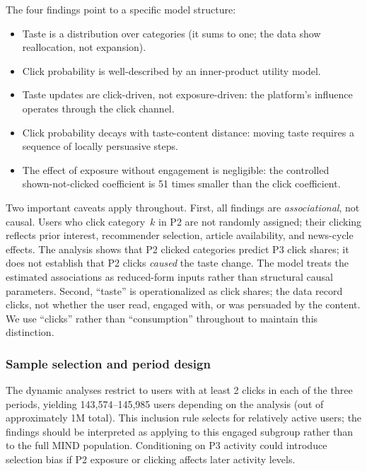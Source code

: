 \documentclass[11pt]{article}
\begin{document}
The four findings point to a specific model structure:
\begin{itemize}[leftmargin=1.5em, itemsep=0.2em]
\item Taste is a distribution over categories (it sums to one; the data show reallocation, not expansion).
\item Click probability is well-described by an inner-product utility model.
\item Taste updates are click-driven, not exposure-driven: the platform's influence operates through the click channel.
\item Click probability decays with taste-content distance: moving taste requires a sequence of locally persuasive steps.
\item The effect of exposure without engagement is negligible: the controlled shown-not-clicked coefficient is 51 times smaller than the click coefficient.
\end{itemize}

\noindent Two important caveats apply throughout. First, all findings are \emph{associational}, not causal. Users who click category~$k$ in P2 are not randomly assigned; their clicking reflects prior interest, recommender selection, article availability, and news-cycle effects. The analysis shows that P2 clicked categories predict P3 click shares; it does not establish that P2 clicks \emph{caused} the taste change. The model treats the estimated associations as reduced-form inputs rather than structural causal parameters. Second, ``taste'' is operationalized as click shares; the data record clicks, not whether the user read, engaged with, or was persuaded by the content. We use ``clicks'' rather than ``consumption'' throughout to maintain this distinction.

\subsubsection{Sample selection and period design}\label{sec:sample_selection}

The dynamic analyses restrict to users with at least 2 clicks in each of the three periods, yielding 143,574--145,985 users depending on the analysis (out of approximately 1M total). This inclusion rule selects for relatively active users; the findings should be interpreted as applying to this engaged subgroup rather than to the full MIND population. Conditioning on P3 activity could introduce selection bias if P2 exposure or clicking affects later activity levels.
\end{document}
